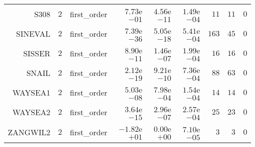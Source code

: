 \begin{longtable}{rrrrrrrrr}
S308 & \(     2\) & first\_order & \( 7.73\)e\(-01\) & \( 4.56\)e\(-11\) & \( 1.49\)e\(-04\) & \(    11\) & \(    11\) & \(     0\) \\
SINEVAL & \(     2\) & first\_order & \( 7.39\)e\(-36\) & \( 5.05\)e\(-18\) & \( 5.41\)e\(-04\) & \(   163\) & \(    45\) & \(     0\) \\
SISSER & \(     2\) & first\_order & \( 8.90\)e\(-11\) & \( 1.46\)e\(-07\) & \( 1.99\)e\(-04\) & \(    16\) & \(    16\) & \(     0\) \\
SNAIL & \(     2\) & first\_order & \( 2.12\)e\(-19\) & \( 9.21\)e\(-10\) & \( 7.36\)e\(-04\) & \(    88\) & \(    63\) & \(     0\) \\
WAYSEA1 & \(     2\) & first\_order & \( 5.03\)e\(-08\) & \( 7.98\)e\(-04\) & \( 1.54\)e\(-04\) & \(    14\) & \(    14\) & \(     0\) \\
WAYSEA2 & \(     2\) & first\_order & \( 3.64\)e\(-15\) & \( 2.96\)e\(-07\) & \( 2.57\)e\(-04\) & \(    25\) & \(    23\) & \(     0\) \\
ZANGWIL2 & \(     2\) & first\_order & \(-1.82\)e\(+01\) & \( 0.00\)e\(+00\) & \( 7.10\)e\(-05\) & \(     3\) & \(     3\) & \(     0\) \\\hline
\end{longtable}
